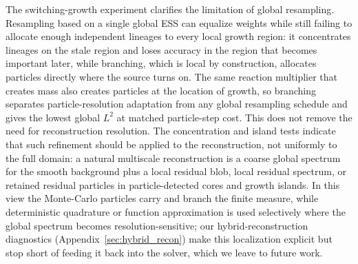 \documentclass[a4paper,fleqn]{cas-sc}
\theoremstyle{definition}
\theoremstyle{remark}
\begin{document}
The switching-growth experiment clarifies the limitation of global resampling.  Resampling based on a single global ESS can equalize weights while still failing to allocate enough independent lineages to every local growth region: it concentrates lineages on the stale region and loses accuracy in the region that becomes important later, while branching, which is local by construction, allocates particles directly where the source turns on.  The same reaction multiplier that creates mass also creates particles at the location of growth, so branching separates particle-resolution adaptation from any global resampling schedule and gives the lowest global $L^2$ at matched particle-step cost.  This does not remove the need for reconstruction resolution.  The concentration and island tests indicate that such refinement should be applied to the reconstruction, not uniformly to the full domain: a natural multiscale reconstruction is a coarse global spectrum for the smooth background plus a local residual blob, local residual spectrum, or retained residual particles in particle-detected cores and growth islands.  In this view the Monte-Carlo particles carry and branch the finite measure, while deterministic quadrature or function approximation is used selectively where the global spectrum becomes resolution-sensitive; our hybrid-reconstruction diagnostics (Appendix~\ref{sec:hybrid_recon}) make this localization explicit but stop short of feeding it back into the solver, which we leave to future work.
\end{document}
